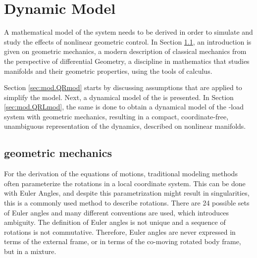\chapter{Dynamic Model} \label{ch:model}
A mathematical model of the system needs to be derived in order to simulate and study the effects of nonlinear geometric control. In Section \ref{sec:mod.geometric}, an introduction is given on geometric mechanics, a modern description of classical mechanics from the perspective of differential Geometry, a discipline in mathematics that studies manifolds and their geometric properties, using the tools of calculus. 

Section \ref{sec:mod.QRmod} starts by discussing assumptions that are applied to simplify the model. Next, a dynamical model of the  is presented. 
In Section \ref{sec:mod.QRLmod}, the same is done to obtain a dynamical model of the -load system with geometric mechanics, resulting in a compact, coordinate-free, unambiguous representation of the dynamics, described on nonlinear manifolds.

\newpage
\section{geometric mechanics}\label{sec:mod.geometric}
For the derivation of the equations of motions, traditional modeling methods often parameterize the rotations in a local coordinate system. 
This can be done with Euler Angles, and despite this parametrization might result in singularities, this is a commonly used method to describe rotations. 
There are 24 possible sets of Euler angles and many different conventions are used, which introduces ambiguity. The definition of Euler angles is not unique and a sequence of rotations is not commutative. Therefore, Euler angles are never expressed in terms of the external frame, or in terms of the co-moving rotated body frame, but in a mixture.

